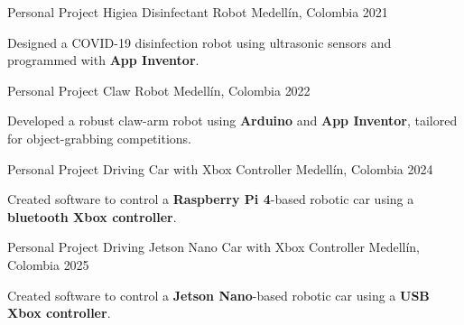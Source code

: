 
\begin{cventries}
  \cventry
  {Personal Project} %
  {Higiea Disinfectant Robot} %
  {Medellín, Colombia} %
  {2021} %
  {
    \begin{cvitems}
      \item {Designed a COVID-19 disinfection robot using ultrasonic sensors and programmed with \textbf{App Inventor}.}
    \end{cvitems}
  }

  \cventry
  {Personal Project} %
  {Claw Robot} %
  {Medellín, Colombia} %
  {2022} %
  {
    \begin{cvitems}
      \item {Developed a robust claw-arm robot using \textbf{Arduino} and \textbf{App Inventor}, tailored for object-grabbing competitions.}
    \end{cvitems}
  }

  \cventry
  {Personal Project} %
  {Driving Car with Xbox Controller} %
  {Medellín, Colombia} %
  {2024} %
  {
    \begin{cvitems}
      \item {Created software to control a \textbf{Raspberry Pi 4}-based robotic car using a \textbf{bluetooth Xbox controller}.}
    \end{cvitems}
  }

  \cventry
  {Personal Project} %
  {Driving Jetson Nano Car with Xbox Controller} %
  {Medellín, Colombia} %
  {2025} %
  {
    \begin{cvitems}
      \item {Created software to control a \textbf{Jetson Nano}-based robotic car using a \textbf{USB Xbox controller}.}
    \end{cvitems}
  }


\end{cventries}
